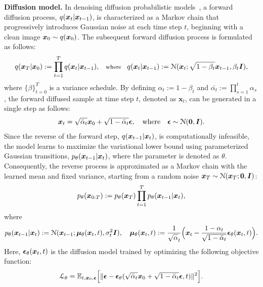 \textbf{Diffusion model.}
In denoising diffusion probabilistic models~\cite{ho2020denoising}, a forward diffusion process, $q({\boldsymbol x}_t|{\boldsymbol x}_{t-1})$, is characterized as a Markov chain that progressively introduces Gaussian noise at each time step $t$, beginning with a clean image ${\boldsymbol x}_0 \sim q({\boldsymbol x}_0)$. The subsequent forward diffusion process is formulated as follows:
\begin{align}
\footnotesize
    q({\boldsymbol x}_{T}|{\boldsymbol x}_0):=\prod_{t=1}^{T}q({\boldsymbol x}_t|{\boldsymbol x}_{t-1}),\quad \mbox{where}\quad
    q({\boldsymbol x}_t|{\boldsymbol x}_{t-1}):={\mathcal N}({\boldsymbol x}_t;\sqrt{1-\beta_t}{\boldsymbol x}_{t-1},\beta_t{\boldsymbol I}),
\end{align}
where $\{\beta\}_{t=0}^{T}$ is a variance schedule.
By defining $\alpha_t {:=} 1 {-} \beta_t$ and $\bar{\alpha_t} {:=} \prod_{s=1}^t\alpha_s$, the forward diffused sample at time step $t$, denoted as $\bm x_t$, can be generated in a single step as follows:
\begin{align}
    \label{eq:ddpm}
    {\boldsymbol x}_t=\sqrt{\bar{\alpha}_t}{\boldsymbol x}_0+\sqrt{1-\bar{\alpha}_t}\boldsymbol{\epsilon},\quad \mbox{where}\quad \boldsymbol{\epsilon}\sim{\mathcal N}(\textbf{0},{\boldsymbol I}).
\end{align}
Since the reverse of the forward step, $q({\boldsymbol x}_{t-1}|{\boldsymbol x}_t)$, is computationally infeasible, the model learns to maximize the variational lower bound using parameterized Gaussian transitions, $p_\theta({\boldsymbol x}_{t-1}|{\boldsymbol x}_t)$, where the parameter is denoted as $\theta$. Consequently, the reverse process is approximated as a Markov chain with the learned mean and fixed variance, starting from  a random noise ${\boldsymbol x}_T \sim  {\mathcal N}({\boldsymbol x}_T; \textbf{0}, \boldsymbol{I})$:
\begin{align}
    p_\theta({\boldsymbol x}_{0:T}):=p_\theta({\boldsymbol x}_T)\prod_{t=1}^{T}p_\theta({\boldsymbol x}_{t-1}|{\boldsymbol x}_{t}), 
\end{align}
\mbox{where}
\begin{align}\label{eq:mu}
     p_\theta({\boldsymbol x}_{t-1}|{\boldsymbol x}_{t}):={\mathcal N}({\boldsymbol x}_{t-1};{\boldsymbol\mu}_\theta({\boldsymbol x}_t,t),\sigma_t^2{\boldsymbol I}), \quad
    {\boldsymbol\mu}_\theta({\boldsymbol x}_t,t):=\frac{1}{\sqrt{\alpha}_t}\Big{(}{\boldsymbol x}_t-\frac{1-\alpha_t}{\sqrt{1-\bar{\alpha}_t}}\boldsymbol{\epsilon}_\theta({\boldsymbol x}_t,t)\Big{)}.
\end{align}
Here, $\boldsymbol{\epsilon}_\theta({\boldsymbol x}_t,t)$ is the diffusion model trained by optimizing the following objective function:
\begin{align}
    \label{eq:objective}
    \mathcal{L}_{\theta}=\mathbb{E}_{t,{\boldsymbol x}_0,\boldsymbol{\epsilon}}\Big{[}\|\boldsymbol{\epsilon}-\boldsymbol{\epsilon}_\theta(\sqrt{\bar{\alpha}_t}{\boldsymbol x}_0+\sqrt{1-\bar{\alpha}_t}\boldsymbol{\epsilon},t)\|^2\Big{]}.
\end{align}
